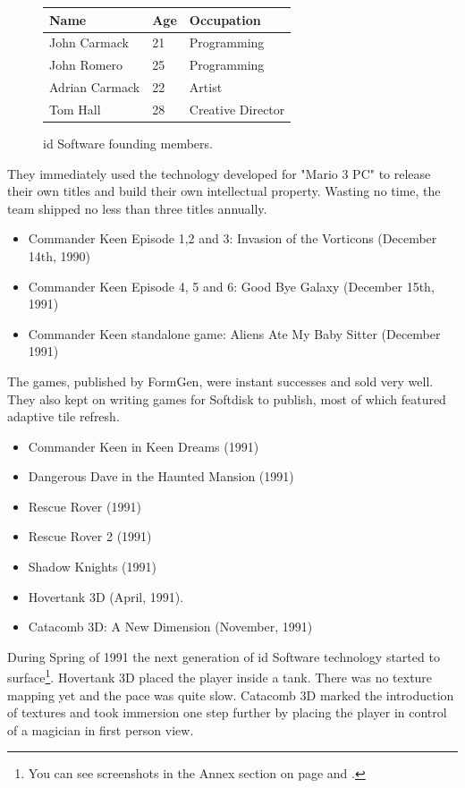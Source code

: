 \documentclass[book.tex]{subfiles}
\begin{document}
 \begin{figure}[H]
\centering  
\begin{tabularx}{\textwidth}{ X  X  X  }
  \toprule
  \textbf{Name} &  \textbf{Age} & \textbf{Occupation} \\
  \toprule 
   John Carmack & 21 &  Programming\\
   John Romero & 25 &  Programming\\
   Adrian Carmack & 22 &  Artist\\
   Tom Hall & 28 &  Creative Director\\
     \toprule
\end{tabularx}
\caption{id Software founding members.}\label{fig:Id Software team}
\end{figure}
They immediately used the technology developed for "Mario 3 PC" to release their own titles and build their own intellectual property. Wasting no time, the team shipped no less than three titles annually.
\begin{itemize}
    \item Commander Keen Episode 1,2 and 3: Invasion of the Vorticons (December 14th, 1990)
    \item Commander Keen Episode 4, 5 and 6: Good Bye Galaxy (December 15th, 1991)
    \item Commander Keen standalone game: Aliens Ate My Baby Sitter (December 1991)
\end{itemize}
The games, published by FormGen, were instant successes and sold very well. They also kept on writing games for Softdisk to publish, most of which featured adaptive tile refresh.
\begin{itemize}
  \item Commander Keen in Keen Dreams (1991)
  \item Dangerous Dave in the Haunted Mansion (1991)
  \item Rescue Rover (1991)
  \item Rescue Rover 2 (1991)
  \item Shadow Knights (1991)
  \item Hovertank 3D (April, 1991).
  \item Catacomb 3D: A New Dimension (November, 1991)
\end{itemize}
During Spring of 1991 the next generation of id Software technology started to surface\footnote{You can see screenshots in the Annex section on page \pageref{hovertank3d_screenshot} and \pageref{catacomb3d_screenshot}.}. Hovertank 3D placed the player inside a tank. There was no texture mapping yet and the pace was quite slow. Catacomb 3D marked the introduction of textures and took immersion one step further by placing the player in control of a magician in first person view. \\
\par
\end{document}
